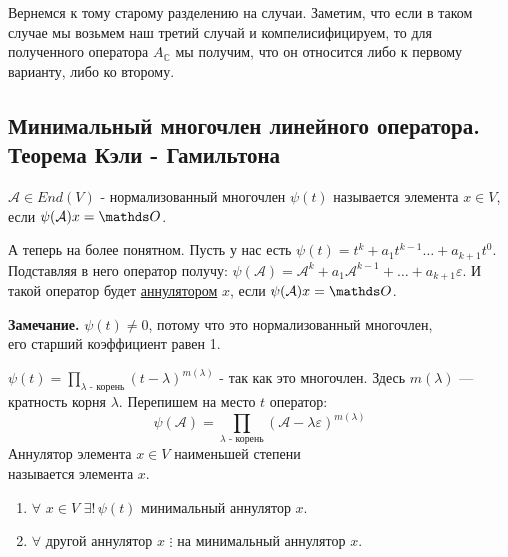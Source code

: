 Вернемся к тому старому разделению на случаи. Заметим, что если в таком случае мы возьмем наш третий случай и компелисифицируем, то для полученного оператора $A_{\mathbb{C}}$ мы получим, что он относится либо к первому варианту, либо ко второму.

\subsection{Минимальный многочлен линейного оператора. Теорема Кэли - Гамильтона}

 $\mathcal{A}\in End(V)$ - нормализованный многочлен $\psi(t)$ называется  элемента $x \in V$, если $\psi(\mathcal{A}) x = \zero$.

А теперь на более понятном. Пусть у нас есть  $\psi(t) = t^k +a_1t^{k-1} \ldots +a_{k+1}t^0$. Подставляя в него оператор получу: $\psi(\mathcal{A}) = \mathcal{A}^k +a_1\mathcal{A}^{k-1}+\ldots + a_{k+1}\varepsilon$. И такой оператор будет \uline{аннулятором} $x$, если $\psi(\mathcal{A})x = \zero$.

\textbf{Замечание.} $\psi(t) \neq 0$, потому что это нормализованный многочлен, \\ его старший коэффициент равен 1.

$\psi(t) = \prod\limits_{\lambda \text{ - корень}}(t-\lambda)^{m(\lambda)}$ -  так как это многочлен. Здесь $m(\lambda)$ --- кратность корня $\lambda$. Перепишем на место $t$ оператор:
$$\psi(\mathcal{A} ) = \prod\limits_{\lambda \text{ - корень} }(\mathcal{A} -\lambda  \varepsilon)^{m(\lambda)}$$
 Аннулятор элемента $x\in V$ наименьшей степени \\ называется  элемента $x$. 

\begin{enumerate}
    \item $\forall $ $x \in V $ $ \exists! \, \psi(t)$ минимальный аннулятор $x$.
    \item $\forall$ другой аннулятор $x$  $\vdots$ на минимальный аннулятор $x$.
\end{enumerate}

